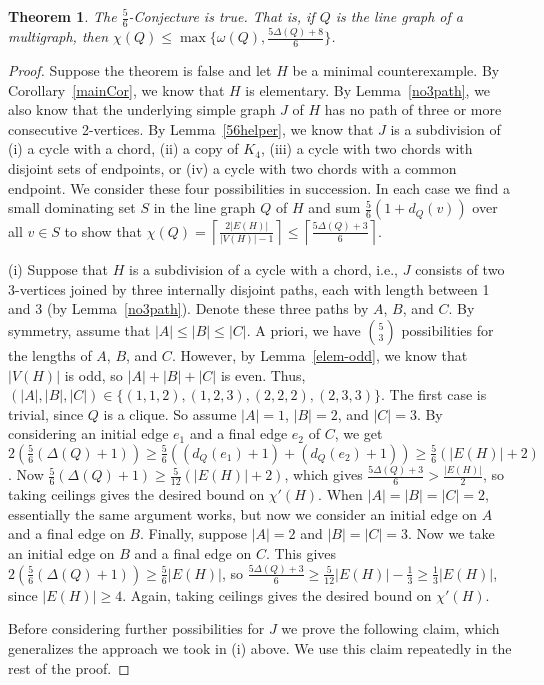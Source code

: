 \documentclass[12pt]{amsart}
\theoremstyle{plain}
\newtheorem{thm}{Theorem}
\theoremstyle{definition}
\theoremstyle{remark}
\newcommand{\ceil}[1]{\left\lceil#1\right\rceil}
\begin{document}
\begin{thm}
The $\frac56$-Conjecture is true.  That is, if $Q$ is the line graph of a
multigraph, then $\chi(Q)\le \max\{\omega(Q),\frac{5\Delta(Q)+8}6\}$.
\end{thm}
\begin{proof}
Suppose the theorem is false and let $H$ be a minimal counterexample.  By
Corollary~\ref{mainCor}, we know that $H$ is elementary.  By
Lemma~\ref{no3path}, we also know that the underlying simple graph $J$ of $H$
has no path of three or more consecutive 2-vertices.
By Lemma~\ref{56helper}, we know that $J$ is a subdivision of 
(i) a cycle with a chord, (ii) a copy of $K_4$, (iii) a cycle with two chords
with disjoint sets of endpoints, or (iv) a cycle with two chords with a common
endpoint.  We consider these four possibilities in succession.  In each case we
find a small dominating set $S$ in the line graph $Q$ of $H$ and sum
$\frac56(1+d_Q(v))$ over all $v\in S$ to show that
$\chi(Q)=\ceil{\frac{2|E(H)|}{|V(H)|-1}}\le \ceil{\frac{5\Delta(Q)+3}6}$.

(i) Suppose that $H$ is a subdivision of a cycle with a chord, i.e., $J$
consists of two 3-vertices joined by three internally disjoint paths, each
with length between 1 and 3 (by Lemma~\ref{no3path}).  
Denote these three paths by $A$, $B$, and $C$.  By
symmetry, assume that $|A|\le |B|\le |C|$.  A priori, we have ${5\choose 3}$
possibilities for the lengths of $A$, $B$, and $C$.  However, by
Lemma~\ref{elem-odd}, we know that $|V(H)|$ is odd, so $|A|+|B|+|C|$ is even.  
Thus, $(|A|,|B|,|C|)\in\{(1,1,2),(1,2,3),(2,2,2),(2,3,3)\}$.
The first case is trivial, since $Q$ is a clique.  So assume $|A|=1$, $|B|=2$,
and $|C|=3$.  By considering an initial edge $e_1$ and a final edge $e_2$ of
$C$, we get $2(\frac56(\Delta(Q)+1))\ge
\frac56((d_Q(e_1)+1)+(d_Q(e_2)+1))\ge\frac56(|E(H)|+2)$. Now
$\frac56(\Delta(Q)+1)\ge\frac5{12}(|E(H)|+2)$, which gives
$\frac{5\Delta(Q)+3}6>\frac{|E(H)|}2$, so taking ceilings gives the desired
bound on $\chi'(H)$.  When $|A|=|B|=|C|=2$, essentially the same argument works,
but now we consider an initial edge on $A$ and a final edge on $B$.
Finally, suppose $|A|=2$ and $|B|=|C|=3$.  Now we take an initial edge on $B$
and a final edge on $C$.  This gives $2(\frac56(\Delta(Q)+1))\ge\frac56|E(H)|$, so
$\frac{5\Delta(Q)+3}6\ge\frac5{12}|E(H)|-\frac13\ge\frac13|E(H)|$, since
$|E(H)|\ge 4$.  Again, taking ceilings gives the desired bound on $\chi'(H)$.


Before considering further possibilities for $J$ we prove the
following claim, which generalizes the approach we took in (i) above.
We use this claim repeatedly in the rest of the proof.


\end{proof}
\end{document}
